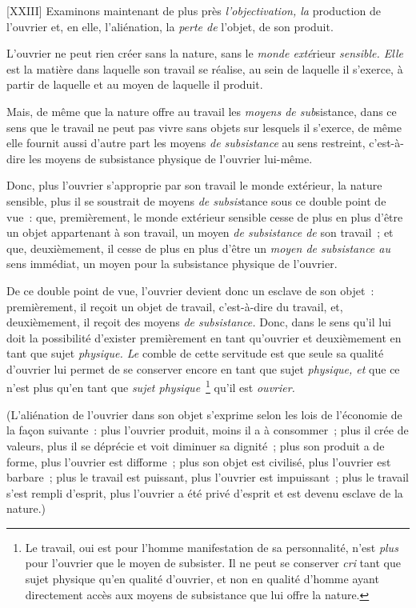 \documentclass[french,twoside]{book} %
\begin{document}
[XXIII] Examinons maintenant de plus près \emph{l’objectivation, la} production de l’ouvrier et, en elle, l’aliénation, la \emph{perte de} l’objet, de son produit.\par
L’ouvrier ne peut rien créer sans la nature, sans le \emph{monde exté}rieur \emph{sensible. Elle} est la matière dans laquelle son travail se réalise, au sein de laquelle il s’exerce, à partir de laquelle et au moyen de laquelle il produit.\par
Mais, de même que la nature offre au travail les \emph{moyens de sub}sistance, dans ce sens que le travail ne peut pas vivre sans objets sur lesquels il s’exerce, de même elle fournit aussi d’autre part les moyens \emph{de subsistance} au sens restreint, c’est-à-dire les moyens de subsistance physique de l’ouvrier lui-même.\par
Donc, plus l’ouvrier s’approprie par son travail le monde extérieur, la nature sensible, plus il se soustrait de moyens \emph{de subsis}tance sous ce double point de vue : que, premièrement, le monde extérieur sensible cesse de plus en plus d’être un objet appartenant à son travail, un moyen \emph{de subsistance de} son travail ; et que, deuxièmement, il cesse de plus en plus d’être un \emph{moyen de subsistance au} sens immédiat, un moyen pour la subsistance physique de l’ouvrier.\par
De ce double point de vue, l’ouvrier devient donc un esclave de son objet : premièrement, il reçoit un objet de travail, c’est-à-dire du travail, et, deuxièmement, il reçoit des moyens \emph{de subsistance.} Donc, dans le sens qu’il lui doit la possibilité d’exister premièrement en tant qu’ouvrier et deuxièmement en tant que sujet \emph{physique. Le} comble de cette servitude est que seule sa qualité d’ouvrier lui permet de se conserver encore en tant que sujet \emph{physique, et} que ce n’est plus qu’en tant que \emph{sujet physique} \footnote{Le travail, oui est pour l’homme manifestation de sa personnalité, n’est \emph{plus} pour l’ouvrier que le moyen de subsister. Il ne peut se conserver \emph{cri} tant que sujet physique qu’en qualité d’ouvrier, et non en qualité d’homme ayant directement accès aux moyens de subsistance que lui offre la nature.} qu’il est \emph{ouvrier.}\par
(L’aliénation de l’ouvrier dans son objet s’exprime selon les lois de l’économie de la façon suivante : plus l’ouvrier produit, moins il a à consommer ; plus il crée de valeurs, plus il se déprécie et voit diminuer sa dignité ; plus son produit a de forme, plus l’ouvrier est difforme ; plus son objet est civilisé, plus l’ouvrier est barbare ; plus le travail est puissant, plus l’ouvrier est impuissant ; plus le travail s’est rempli d’esprit, plus l’ouvrier a été privé d’esprit et est devenu esclave de la nature.)\par
\end{document}
